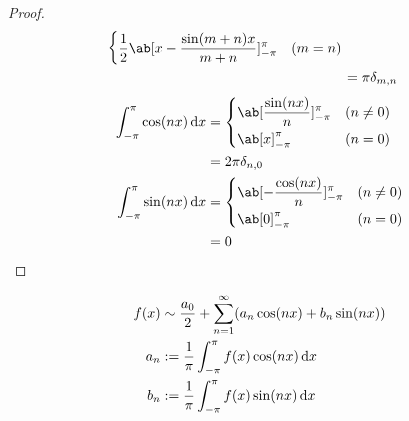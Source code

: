 \documentclass[uplatex,dvipdfmx,a4paper,11pt]{jlreq}
\begin{document}
\begin{proof}
\begin{align}
\begin{dcases}
                                                 \frac{1}{2}\ab[x - \frac{\sin(m + n)x}{m + n}]_{-\pi}^\pi                          & (m = n)
                                               \end{dcases} \\
                                           & = \pi\delta_{m,n}
  \end{align}
  \begin{align}
    \int_{-\pi}^\pi \cos(nx)\dl{x} & = \begin{dcases}
                                         \ab[\frac{\sin(nx)}{n}]_{-\pi}^\pi & (n \neq 0) \\
                                         \ab[x]_{-\pi}^\pi                  & (n = 0)
                                       \end{dcases}  \\
                                   & = 2\pi\delta_{n,0}                                     \\
    \int_{-\pi}^\pi \sin(nx)\dl{x} & = \begin{dcases}
                                         \ab[-\frac{\cos(nx)}{n}]_{-\pi}^\pi & (n \neq 0) \\
                                         \ab[0]_{-\pi}^\pi                   & (n = 0)
                                       \end{dcases} \\
                                   & = 0
  \end{align}
\end{proof}

\begin{definition}[$2\pi$ の周期をもつ関数のフーリエ級数]
  \begin{align}
    f(x) & \sim \frac{a_0}{2} + \sum_{n=1}^{\infty}(a_n\cos(nx) + b_n\sin(nx)) \\
    a_n  & := \frac{1}{\pi}\int_{-\pi}^\pi f(x)\cos(nx)\dl{x}                  \\
    b_n  & := \frac{1}{\pi}\int_{-\pi}^\pi f(x)\sin(nx)\dl{x}
  \end{align}
\end{definition}
\end{document}

